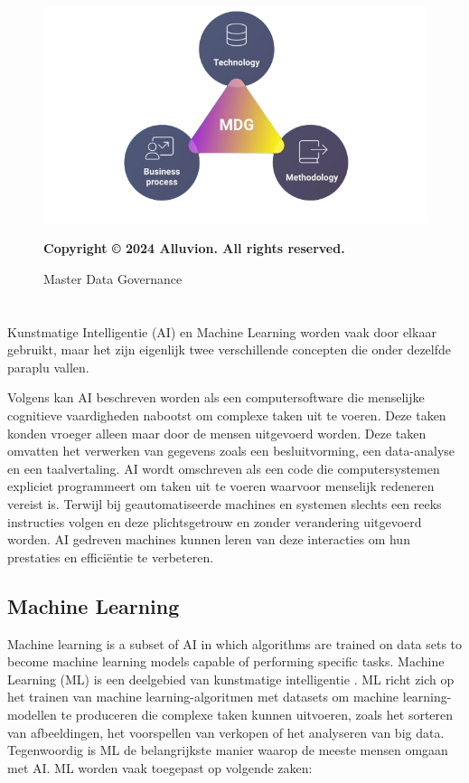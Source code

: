 \begin{figure}[htbp]
  \centering
  \includegraphics[scale=0.5]{../images/AlluvionMDG.png}
  \caption{Master Data Governance}
  \small\textbf{Copyright © 2024 Alluvion. All rights reserved.}
\end{figure}

\section{}%
\label{sec:ai}
Kunstmatige Intelligentie (AI) en Machine Learning worden vaak door elkaar gebruikt, maar het zijn eigenlijk twee verschillende concepten die onder dezelfde paraplu vallen.

Volgens \textcite{Coursera2024} kan AI beschreven worden als een computersoftware die menselijke cognitieve vaardigheden nabootst om complexe taken uit te voeren. Deze taken konden vroeger alleen maar door de mensen uitgevoerd worden. Deze taken omvatten het verwerken van gegevens zoals een besluitvorming, een data-analyse en een taalvertaling. AI wordt omschreven als een code die computersystemen expliciet programmeert om taken uit te voeren waarvoor menselijk redeneren vereist is. Terwijl bij geautomatiseerde machines en systemen slechts een reeks instructies volgen en deze plichtsgetrouw en zonder verandering uitgevoerd worden. AI gedreven machines kunnen leren van deze interacties om hun prestaties en efficiëntie te verbeteren. 

\subsection{Machine Learning}
Machine learning is a subset of AI in which algorithms are trained on data sets to become machine learning models capable of performing specific tasks.  
Machine Learning (ML) is een deelgebied van kunstmatige intelligentie \autocite{Coursera2024}. ML richt zich op het trainen van machine learning-algoritmen met datasets om machine learning-modellen te produceren die complexe taken kunnen uitvoeren, zoals het sorteren van afbeeldingen, het voorspellen van verkopen of het analyseren van big data. Tegenwoordig is ML de belangrijkste manier waarop de meeste mensen omgaan met AI. ML worden vaak toegepast op volgende zaken: 


